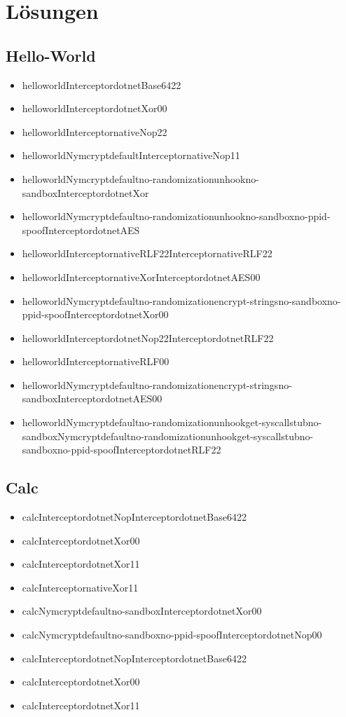 \section{Lösungen}
\subsection{Hello-World}
\begin{itemize}
\item helloworldInterceptordotnetBase6422
\item helloworldInterceptordotnetXor00
\item helloworldInterceptornativeNop22
\item helloworldNymcryptdefaultInterceptornativeNop11
\item helloworldNymcryptdefault\-no-randomizationunhookno-sandbox\-InterceptordotnetXor
\item helloworldNymcryptdefaultno-randomizationunhookno-sandboxno-ppid-spoofInterceptordotnetAES
\item helloworldInterceptornativeRLF22InterceptornativeRLF22
\item helloworldInterceptornativeXorInterceptordotnetAES00
\item helloworldNymcryptdefaultno-randomizationencrypt-stringsno-sandboxno-ppid-spoof\-InterceptordotnetXor00
\item helloworldInterceptordotnetNop22InterceptordotnetRLF22
\item helloworldInterceptornativeRLF00
\item helloworldNymcryptdefaultno-randomization\-encrypt-stringsno-sandbox\-InterceptordotnetAES00
\item helloworldNymcryptdefaultno-randomizationunhookget-syscallstubno-sandbox\-Nymcryptdefaultno-randomizationunhookget-syscallstubno-sandboxno-ppid-spoofInterceptordotnetRLF22
\end{itemize}

\subsection{Calc}
\begin{itemize}
\item calcInterceptordotnetNopInterceptordotnetBase6422
\item calcInterceptordotnetXor00
\item calcInterceptordotnetXor11
\item calcInterceptornativeXor11
\item calcNymcryptdefaultno-sandboxInterceptordotnetXor00
\item calcNymcryptdefaultno-sandboxno-ppid-spoofInterceptordotnetNop00
\item calcInterceptordotnetNopInterceptordotnetBase6422
\item calcInterceptordotnetXor00
\item calcInterceptordotnetXor11
\end{itemize}
    
